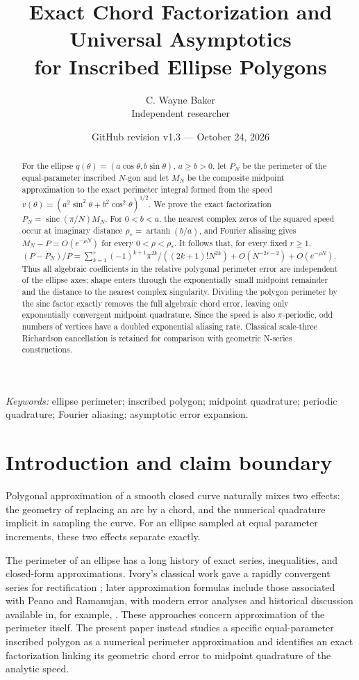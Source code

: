 \documentclass[11pt]{article}
\title{Exact Chord Factorization and Universal Asymptotics\\
for Inscribed Ellipse Polygons}
\author{C. Wayne Baker\\
Independent researcher}
\date{GitHub revision v1.3 --- October 24, 2026}
\theoremstyle{definition}
\newcommand{\sinc}{\operatorname{sinc}}
\numberwithin{equation}{section}
\begin{document}
\maketitle

\begin{abstract}
For the ellipse \(q(\theta)=(a\cos\theta,b\sin\theta)\), \(a\ge b>0\), let \(P_N\) be the perimeter of the equal-parameter inscribed \(N\)-gon and let \(M_N\) be the composite midpoint approximation to the exact perimeter integral formed from the speed \(v(\theta)=(a^2\sin^2\theta+b^2\cos^2\theta)^{1/2}\). We prove the exact factorization \(P_N=\sinc(\pi/N)M_N\). For \(0<b<a\), the nearest complex zeros of the squared speed occur at imaginary distance \(\rho_*=\operatorname{artanh}(b/a)\), and Fourier aliasing gives \(M_N-P=O(e^{-\rho N})\) for every \(0<\rho<\rho_*\). It follows that, for every fixed \(r\ge1\), \((P-P_N)/P=\sum_{k=1}^{r}(-1)^{k+1}\pi^{2k}/((2k+1)!N^{2k})+O(N^{-2r-2})+O(e^{-\rho N})\). Thus all algebraic coefficients in the relative polygonal perimeter error are independent of the ellipse axes; shape enters through the exponentially small midpoint remainder and the distance to the nearest complex singularity. Dividing the polygon perimeter by the sinc factor exactly removes the full algebraic chord error, leaving only exponentially convergent midpoint quadrature. Since the speed is also $\pi$-periodic, odd numbers of vertices have a doubled exponential aliasing rate. Classical scale-three Richardson cancellation is retained for comparison with geometric N-series constructions.
\end{abstract}

\noindent\textit{Keywords:} ellipse perimeter; inscribed polygon; midpoint quadrature; periodic quadrature; Fourier aliasing; asymptotic error expansion.

\section{Introduction and claim boundary}

Polygonal approximation of a smooth closed curve naturally mixes two
effects: the geometry of replacing an arc by a chord, and the numerical
quadrature implicit in sampling the curve.  For an ellipse sampled at
equal parameter increments, these two effects separate exactly.

The perimeter of an ellipse has a long history of exact series,
inequalities, and closed-form approximations.  Ivory's classical work
gave a rapidly convergent series for rectification
\citet{Ivory1798}; later approximation formulas include those associated
with Peano and Ramanujan, with modern error analyses and historical
discussion available in, for example, \citet{Villarino2006}.  These
approaches concern approximation of the perimeter itself.  The present paper instead studies a specific equal-parameter inscribed
polygon as a numerical perimeter approximation and identifies an exact
factorization linking its geometric chord error to midpoint quadrature
of the analytic speed.
\end{document}
